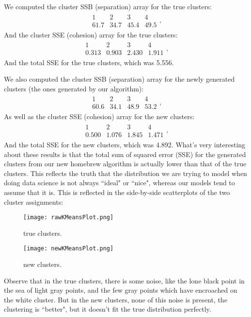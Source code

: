 \documentclass[12pt,oneside,reqno]{amsart}
\theoremstyle{plain}
\theoremstyle{definition}
\theoremstyle{remark}
\newcommand{\bee}{\begin{equation}\begin{aligned}}
\newcommand{\eee}{\end{aligned}\end{equation}}
\begin{document}
We computed the cluster SSB (separation) array for the true clusters:
\bee
\begin{array}{llll}
1 & 2 & 3 & 4\\
\hline
61.7 & 34.7 & 45.4 & 49.5
\end{array},
\eee
And the cluster SSE (cohesion) array for the true clusters:
\bee
\begin{array}{llll}
1 & 2 & 3 & 4\\
\hline
0.313 & 0.903 & 2.430 & 1.911
\end{array},
\eee
And the total SSE for the true clusters, which was 5.556. 

We also computed the cluster SSB (separation) array for the newly generated clusters (the ones generated by our algorithm):
\bee
\begin{array}{llll}
1 & 2 & 3 & 4\\
\hline
60.6 & 34.1 & 48.9 & 53.2
\end{array},
\eee
As well as the cluster SSE (cohesion) array for the new clusters:
\bee
\begin{array}{llll}
1 & 2 & 3 & 4\\
\hline
0.500 & 1.076 & 1.845 & 1.471
\end{array},
\eee
And the total SSE for the new clusters, which was 4.892. What's very interesting about these results is that the total sum of squared error (SSE) for the generated clusters from our new homebrew algorithm is actually lower than that of the true clusters. This reflects the truth that the distribution we are trying to model when doing data science is not always ``ideal" or ``nice", whereas our models tend to assume that it is. This is reflected in the side-by-side scatterplots of the two cluster assignments:

\begin{figure}
\begin{center}
\texttt{[image: rawKMeansPlot.png]}
\end{center}
\caption{true clusters.}
\end{figure}
\begin{figure}

\begin{center}
\texttt{[image: newKMeansPlot.png]}
\end{center}
\caption{new clusters.}
\end{figure}

Observe that in the true clusters, there is some noise, like the lone black point in the sea of light gray points, and the few gray points which have encroached on the white cluster. But in the new clusters, none of this noise is present, the clustering is ``better", but it doesn't fit the true distribution perfectly. 
\end{document}
